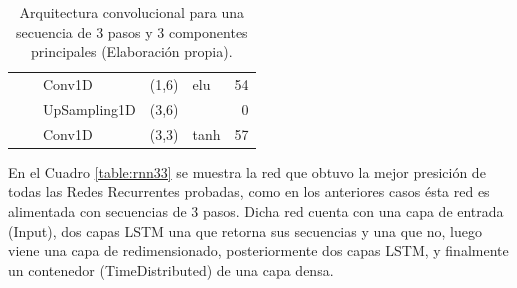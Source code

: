 \begin{table}[H]
\begin{center}
\begin{tabular}{ll|l|r|l|r|}
\multicolumn{1}{|l|}{}                              &                             & Conv1D                             & (1,6)                                & elu                                     & 54                                          \\ \cline{3-6} 
\multicolumn{1}{|l|}{}                              &                             & UpSampling1D                       & (3,6)                                &                                          & 0                                           \\ \cline{3-6} 
\multicolumn{1}{|l|}{}                              &                             & Conv1D                             & \multicolumn{1}{l|}{(3,3)}           & tanh                                     & 57                                          \\ \hline
\end{tabular}
\end{center}
\caption{Arquitectura convolucional para una secuencia de 3 pasos y 3 componentes principales (Elaboraci\'{o}n propia).}
\label{table:cnn33}
\end{table}


En el Cuadro \ref{table:rnn33} se muestra la red que obtuvo la mejor presici\'{o}n de todas las Redes Recurrentes probadas, como en los anteriores casos \'{e}sta red es alimentada con secuencias de 3 pasos. Dicha red cuenta con una capa de entrada (Input), dos capas LSTM una que retorna sus secuencias y una que no, luego viene una capa de redimensionado, posteriormente dos capas LSTM, y finalmente un contenedor  (TimeDistributed) de una capa densa.

